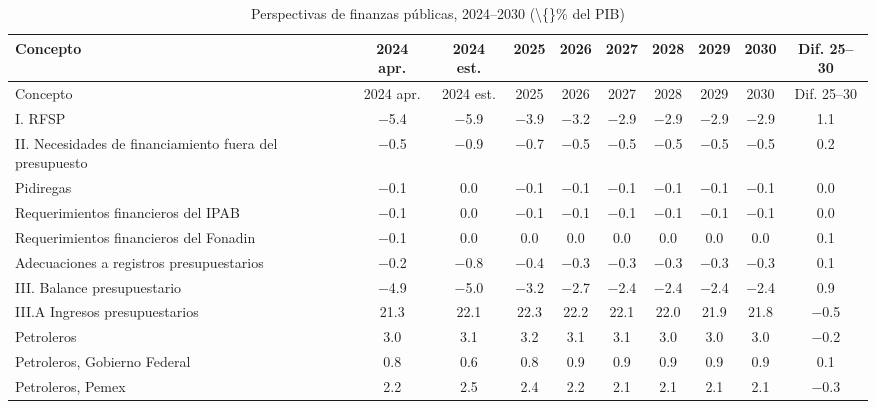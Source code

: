 \footnotesize
\setlength{\tabcolsep}{4pt}
\begin{longtable}{L{3.7cm}ccccccccc}
\caption{Perspectivas de finanzas públicas, 2024--2030 (\textbackslash\{\}\% del PIB)}\label{tab:C12_2}\\
\toprule
{Concepto} & {2024 apr.} & {2024 est.} & {2025} & {2026} & {2027} & {2028} & {2029} & {2030} & {Dif. 25--30} \\
\midrule\endfirsthead
\toprule
{Concepto} & {2024 apr.} & {2024 est.} & {2025} & {2026} & {2027} & {2028} & {2029} & {2030} & {Dif. 25--30} \\
\midrule\endhead
\bottomrule\endfoot
{I. RFSP} & \num{-5.4} & \num{-5.9} & \num{-3.9} & \num{-3.2} & \num{-2.9} & \num{-2.9} & \num{-2.9} & \num{-2.9} & \num{1.1} \\
{II. Necesidades de financiamiento fuera del presupuesto} & \num{-0.5} & \num{-0.9} & \num{-0.7} & \num{-0.5} & \num{-0.5} & \num{-0.5} & \num{-0.5} & \num{-0.5} & \num{0.2} \\
{Pidiregas} & \num{-0.1} & \num{0.0} & \num{-0.1} & \num{-0.1} & \num{-0.1} & \num{-0.1} & \num{-0.1} & \num{-0.1} & \num{0.0} \\
{Requerimientos financieros del IPAB} & \num{-0.1} & \num{0.0} & \num{-0.1} & \num{-0.1} & \num{-0.1} & \num{-0.1} & \num{-0.1} & \num{-0.1} & \num{0.0} \\
{Requerimientos financieros del Fonadin} & \num{-0.1} & \num{0.0} & \num{0.0} & \num{0.0} & \num{0.0} & \num{0.0} & \num{0.0} & \num{0.0} & \num{0.1} \\
{Adecuaciones a registros presupuestarios} & \num{-0.2} & \num{-0.8} & \num{-0.4} & \num{-0.3} & \num{-0.3} & \num{-0.3} & \num{-0.3} & \num{-0.3} & \num{0.1} \\
{III. Balance presupuestario} & \num{-4.9} & \num{-5.0} & \num{-3.2} & \num{-2.7} & \num{-2.4} & \num{-2.4} & \num{-2.4} & \num{-2.4} & \num{0.9} \\
{III.A Ingresos presupuestarios} & \num{21.3} & \num{22.1} & \num{22.3} & \num{22.2} & \num{22.1} & \num{22.0} & \num{21.9} & \num{21.8} & \num{-0.5} \\
{Petroleros} & \num{3.0} & \num{3.1} & \num{3.2} & \num{3.1} & \num{3.1} & \num{3.0} & \num{3.0} & \num{3.0} & \num{-0.2} \\
{Petroleros, Gobierno Federal} & \num{0.8} & \num{0.6} & \num{0.8} & \num{0.9} & \num{0.9} & \num{0.9} & \num{0.9} & \num{0.9} & \num{0.1} \\
{Petroleros, Pemex} & \num{2.2} & \num{2.5} & \num{2.4} & \num{2.2} & \num{2.1} & \num{2.1} & \num{2.1} & \num{2.1} & \num{-0.3} \\

\end{longtable}
